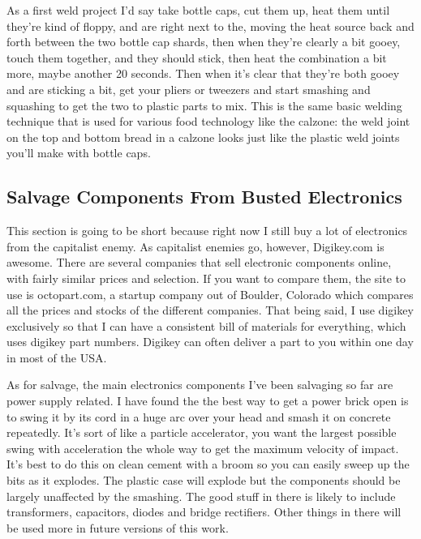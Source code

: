 As a first weld project I'd say take bottle caps, cut them up, heat them
until they're kind of floppy, and are right next to the, moving the heat
source back and forth between the two bottle cap shards, then when
they're clearly a bit gooey, touch them together, and they should stick,
then heat the combination a bit more, maybe another 20 seconds. Then
when it's clear that they're both gooey and are sticking a bit, get your
pliers or tweezers and start smashing and squashing to get the two to
plastic parts to mix. This is the same basic welding technique that is
used for various food technology like the calzone: the weld joint on the
top and bottom bread in a calzone looks just like the plastic weld
joints you'll make with bottle caps.

\subsection{Salvage Components From Busted
Electronics}\label{salvage-components-from-busted-electronics}

This section is going to be short because right now I still buy a lot of
electronics from the capitalist enemy. As capitalist enemies go,
however, Digikey.com is awesome. There are several companies that sell
electronic components online, with fairly similar prices and selection.
If you want to compare them, the site to use is octopart.com, a startup
company out of Boulder, Colorado which compares all the prices and
stocks of the different companies. That being said, I use digikey
exclusively so that I can have a consistent bill of materials for
everything, which uses digikey part numbers. Digikey can often deliver a
part to you within one day in most of the USA.

As for salvage, the main electronics components I've been salvaging so
far are power supply related. I have found the the best way to get a
power brick open is to swing it by its cord in a huge arc over your head
and smash it on concrete repeatedly. It's sort of like a particle
accelerator, you want the largest possible swing with acceleration the
whole way to get the maximum velocity of impact. It's best to do this on
clean cement with a broom so you can easily sweep up the bits as it
explodes. The plastic case will explode but the components should be
largely unaffected by the smashing. The good stuff in there is likely to
include transformers, capacitors, diodes and bridge rectifiers. Other
things in there will be used more in future versions of this work.

